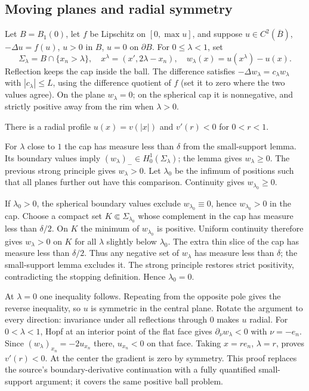 \subsection{Moving planes and radial symmetry}
Let $B=B_1(0)$, let $f$ be Lipschitz on $[0,\max u]$, and suppose
$u\in C^2(\overline B)$, $-\Delta u=f(u)$, $u>0$ in $B$, $u=0$ on
$\partial B$. For $0\leq\lambda<1$, set
\[
 \Sigma_\lambda=B\cap\{x_n>\lambda\},\quad
 x^\lambda=(x',2\lambda-x_n),\quad
 w_\lambda(x)=u(x^\lambda)-u(x).
\]
Reflection keeps the cap inside the ball. The difference satisfies
$-\Delta w_\lambda=c_\lambda w_\lambda$ with $|c_\lambda|\leq L$,
using the difference quotient of $f$ (set it to zero where the two values
agree). On the plane $w_\lambda=0$; on the spherical cap it is
nonnegative, and strictly positive away from the rim when $\lambda>0$.
\Needspace{50mm}
\begin{theorem}
There is a radial profile $u(x)=v(|x|)$ and $v'(r)<0$ for $0<r<1$.
\end{theorem}
\begin{expandedproof}
For $\lambda$ close to $1$ the cap has measure less than $\delta$ from
the small-support lemma. Its boundary values imply
$(w_\lambda)_-\in H^1_0(\Sigma_\lambda)$; the lemma gives
$w_\lambda\geq0$. The previous strong principle gives $w_\lambda>0$.
Let $\lambda_0$ be the infimum of positions such that all planes further
out have this comparison. Continuity gives $w_{\lambda_0}\geq0$.

If $\lambda_0>0$, the spherical boundary values exclude
$w_{\lambda_0}\equiv0$, hence $w_{\lambda_0}>0$ in the cap. Choose a
compact set $K\Subset\Sigma_{\lambda_0}$ whose complement in the cap
has measure less than $\delta/2$. On $K$ the minimum of
$w_{\lambda_0}$ is positive. Uniform continuity therefore gives
$w_\lambda>0$ on $K$ for all $\lambda$ slightly below $\lambda_0$.
The extra thin slice of the cap has measure less than $\delta/2$.
Thus any negative set of $w_\lambda$ has measure less than $\delta$;
the small-support lemma excludes it. The strong principle restores strict
positivity, contradicting the stopping definition. Hence $\lambda_0=0$.

At $\lambda=0$ one inequality follows. Repeating from the opposite pole
gives the reverse inequality, so $u$ is symmetric in the central plane.
Rotate the argument to every direction: invariance under all reflections
through $0$ makes $u$ radial. For $0<\lambda<1$, Hopf at an interior
point of the flat face gives $\partial_\nu w_\lambda<0$ with
$\nu=-e_n$. Since $(w_\lambda)_{x_n}=-2u_{x_n}$ there,
$u_{x_n}<0$ on that face. Taking $x=re_n$, $\lambda=r$, proves
$v'(r)<0$. At the center the gradient is zero by symmetry.
This proof replaces the source's boundary-derivative continuation with a
fully quantified small-support argument; it covers the same positive ball problem.
\end{expandedproof}
